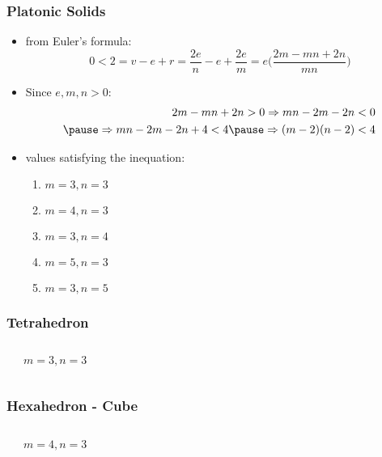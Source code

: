 \documentclass[dvipsnames]{beamer}
\begin{document}
\begin{frame}
  \frametitle{Platonic Solids}

    \begin{itemize}
      \item from Euler's formula:
      \[
        0 < 2 = v - e + r = \frac{2e}{n} - e + \frac{2e}{m}
        = e \Big( \frac{2m-mn+2n}{mn} \Big)
      \]

      \pause
      \item Since $e,m,n > 0$:
      \begin{eqnarray*}
        2m - mn + 2n > 0 \Rightarrow mn - 2m -2n < 0 \\\pause
        \Rightarrow mn - 2m - 2n + 4 < 4 \pause \Rightarrow (m - 2)(n - 2) < 4
      \end{eqnarray*}

      \pause
      \item values satisfying the inequation:
      \begin{enumerate}
        \item $m=3, n=3$
        \item $m=4, n=3$
        \item $m=3, n=4$
        \item $m=5, n=3$
        \item $m=3, n=5$
      \end{enumerate}
    \end{itemize}
\end{frame}

\begin{frame}
  \frametitle{Tetrahedron}

  \begin{columns}
    \begin{center}
    \end{center}

    \begin{center}

      $m=3, n=3$
    \end{center}
  \end{columns}
\end{frame}

\begin{frame}
  \frametitle{Hexahedron - Cube}

  \begin{columns}
    \begin{center}
    \end{center}

    \begin{center}

      $m=4, n=3$
    \end{center}
  \end{columns}
\end{frame}
\end{document}
